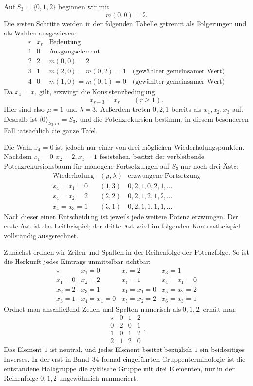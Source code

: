 \documentclass[main.tex]{subfiles}
\begin{document}
Auf \(S_3=\{0,1,2\}\) beginnen wir mit
\[
  m(0,0)=2.
\]
Die ersten Schritte werden in der folgenden Tabelle getrennt als
Folgerungen und als Wahlen ausgewiesen:
\[
\begin{array}{c|c|l}
r&x_r&\text{Bedeutung}\\\hline
1&0&\text{Ausgangselement}\\
2&2&m(0,0)=2\\
3&1&m(2,0)=m(0,2)=1\quad\text{(gewählter gemeinsamer Wert)}\\
4&0&m(1,0)=m(0,1)=0\quad\text{(gewählter gemeinsamer Wert)}
\end{array}
\]
Da \(x_4=x_1\) gilt, erzwingt die Konsistenzbedingung
\[
  x_{r+3}=x_r
  \qquad(r\geq1).
\]
Hier sind also \(\mu=1\) und \(\lambda=3\).  Außerdem treten \(0,2,1\)
bereits als \(x_1,x_2,x_3\) auf.  Deshalb ist
\(\langle0\rangle_{S_3,m}=S_3\), und die Potenzrekursion bestimmt in diesem
besonderen Fall tatsächlich die ganze Tafel.

Die Wahl \(x_4=0\) ist jedoch nur einer von drei möglichen
Wiederholungspunkten.  Nachdem \(x_1=0,x_2=2,x_3=1\) feststehen, besitzt der
verbleibende Potenzrekursionsbaum für monogene Fortsetzungen auf \(S_3\) nur
noch drei Äste:
\[
\begin{array}{c|c|c}
\text{Wiederholung}&(\mu,\lambda)&\text{erzwungene Fortsetzung}\\\hline
x_4=x_1=0&(1,3)&0,2,1,0,2,1,\ldots\\
x_4=x_2=2&(2,2)&0,2,1,2,1,2,\ldots\\
x_4=x_3=1&(3,1)&0,2,1,1,1,1,\ldots
\end{array}
\]
Nach dieser einen Entscheidung ist jeweils jede weitere Potenz erzwungen.
Der erste Ast ist das Leitbeispiel; der dritte Ast wird im folgenden
Kontrastbeispiel vollständig ausgerechnet.

Zunächst ordnen wir Zeilen und Spalten in der Reihenfolge der Potenzfolge.
So ist die Herkunft jedes Eintrags unmittelbar sichtbar:
\[
\boxed{
\begin{array}{c|ccc}
\star&x_1=0&x_2=2&x_3=1\\\hline
x_1=0&x_2=2&x_3=1&x_4=x_1=0\\
x_2=2&x_3=1&x_4=x_1=0&x_5=x_2=2\\
x_3=1&x_4=x_1=0&x_5=x_2=2&x_6=x_3=1
\end{array}}
\]
Ordnet man anschließend Zeilen und Spalten numerisch als \(0,1,2\), erhält
man
\[
\begin{array}{c|ccc}
\star&0&1&2\\\hline
0&2&0&1\\
1&0&1&2\\
2&1&2&0
\end{array}.
\]
Das Element \(1\) ist neutral, und jedes Element besitzt bezüglich \(1\) ein
beidseitiges Inverses.  In der erst in Band~34 formal eingeführten
Gruppenterminologie ist die entstandene Halbgruppe die zyklische Gruppe mit
drei Elementen, nur in der Reihenfolge \(0,1,2\) ungewöhnlich nummeriert.
\end{document}
